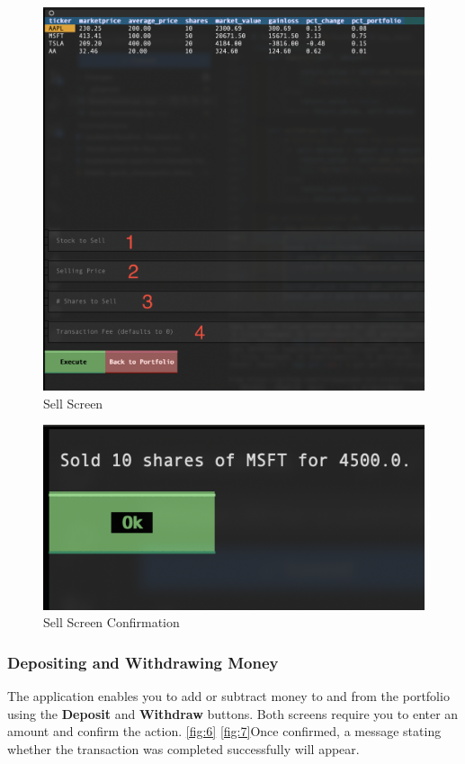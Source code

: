 \documentclass{article}
\begin{document}
\begin{figure}
    \centering
    \includegraphics[width=1\linewidth]{SellScreen.png}
    \caption{Sell Screen}
    \label{fig:4}
\end{figure}

\begin{figure}
    \centering
    \includegraphics[width=1\linewidth]{SellScreenConfirmation.png}
    \caption{Sell Screen Confirmation}
    \label{fig:5}
\end{figure}

\subsubsection{Depositing and Withdrawing Money}
The application enables you to add or subtract money to and from the portfolio using the \textbf{Deposit} and \textbf{Withdraw} buttons. Both screens require you to enter an amount and confirm the action. \autoref{fig:6} \autoref{fig:7}Once confirmed, a message stating whether the transaction was completed successfully will appear. 
\end{document}
